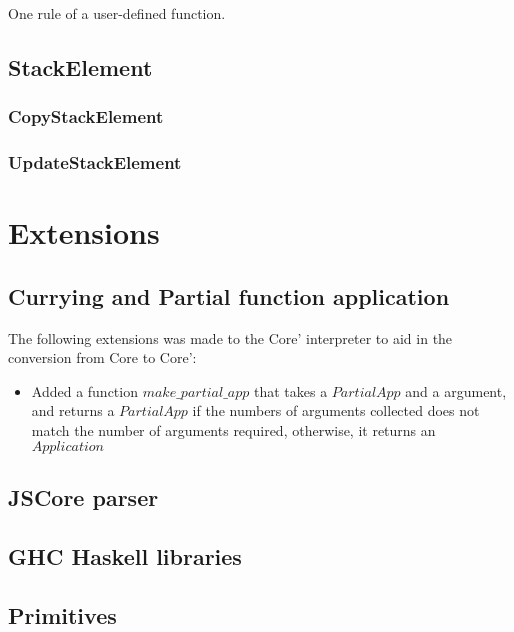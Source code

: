 One rule of a user-defined function.

\subsection*{StackElement}

\subsubsection*{CopyStackElement}

\subsubsection*{UpdateStackElement}



\section{Extensions}


\subsection{Currying and Partial function application}



The following extensions was made to the Core' interpreter to aid in the conversion from
Core to Core':

\begin{itemize}
\item Added a function $make\_partial\_app$ that takes a $PartialApp$ and a argument, and returns
a $PartialApp$ if the numbers of arguments collected does not match the number of arguments required,
otherwise, it returns an $Application$
\end{itemize}






\subsection{JSCore parser}

\subsection{GHC Haskell libraries}



\subsection{Primitives}


